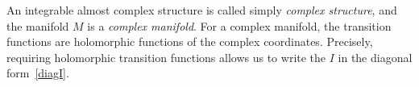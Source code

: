 \documentclass[debug]{phd}
\begin{document}
						An integrable almost complex structure is called simply \emph{complex structure}, and the manifold $M$ is a \emph{complex manifold}.
						For a complex manifold, the transition functions are holomorphic functions of the complex coordinates.
						Precisely, requiring holomorphic transition functions allows us to write the $I$ in the diagonal form~\eqref{diagI}.
\end{document}
